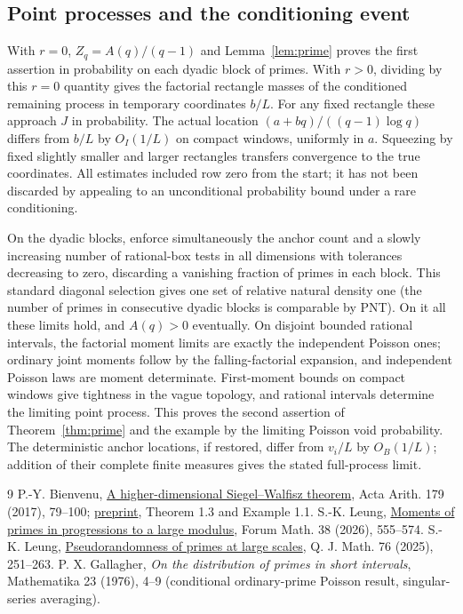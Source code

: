 \documentclass[11pt]{article}
\newcommand{\1}{\mathbf{1}}
\begin{document}
\subsection{Point processes and the conditioning event}
With $r=0$, $Z_q=A(q)/(q-1)$ and Lemma~\ref{lem:prime} proves the first assertion in probability on each dyadic block of primes. With $r>0$, dividing by this $r=0$ quantity gives the factorial rectangle masses of the conditioned remaining process in temporary coordinates $b/L$. For any fixed rectangle these approach $J$ in probability. The actual location $(a+bq)/((q-1)\log q)$ differs from $b/L$ by $O_I(1/L)$ on compact windows, uniformly in $a$. Squeezing by fixed slightly smaller and larger rectangles transfers convergence to the true coordinates. All estimates included row zero from the start; it has not been discarded by appealing to an unconditional probability bound under a rare conditioning.
\par On the dyadic blocks, enforce simultaneously the anchor count and a slowly increasing number of rational-box tests in all dimensions with tolerances decreasing to zero, discarding a vanishing fraction of primes in each block. This standard diagonal selection gives one set of relative natural density one (the number of primes in consecutive dyadic blocks is comparable by PNT). On it all these limits hold, and $A(q)>0$ eventually. On disjoint bounded rational intervals, the factorial moment limits are exactly the independent Poisson ones; ordinary joint moments follow by the falling-factorial expansion, and independent Poisson laws are moment determinate. First-moment bounds on compact windows give tightness in the vague topology, and rational intervals determine the limiting point process. This proves the second assertion of Theorem~\ref{thm:prime} and the example by the limiting Poisson void probability. The deterministic anchor locations, if restored, differ from $v_i/L$ by $O_B(1/L)$; addition of their complete finite measures gives the stated full-process limit.

\begin{thebibliography}{9}
 P.-Y. Bienvenu, \href{https://www.impan.pl/en/publishing-house/journals-and-series/acta-arithmetica/online/92171/a-higher-dimensional-siegel-walfisz-theorem}{A higher-dimensional Siegel--Walfisz theorem}, Acta Arith. 179 (2017), 79--100; \href{https://arxiv.org/abs/1607.06625}{preprint}, Theorem 1.3 and Example 1.1.
 S.-K. Leung, \href{https://arxiv.org/abs/2402.07941}{Moments of primes in progressions to a large modulus}, Forum Math. 38 (2026), 555--574.
 S.-K. Leung, \href{https://arxiv.org/abs/2407.05380}{Pseudorandomness of primes at large scales}, Q. J. Math. 76 (2025), 251--263.
 P. X. Gallagher, \emph{On the distribution of primes in short intervals}, Mathematika 23 (1976), 4--9 (conditional ordinary-prime Poisson result, singular-series averaging).
\end{thebibliography}
\end{document}
